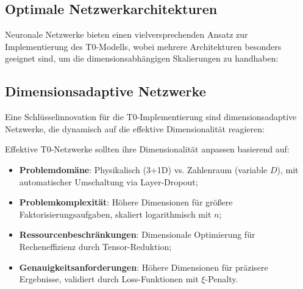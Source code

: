 \subsection{Optimale Netzwerkarchitekturen}
\label{subsec:optimal_architectures}
Neuronale Netzwerke bieten einen vielversprechenden Ansatz zur Implementierung des T0-Modells, wobei mehrere Architekturen besonders geeignet sind, um die dimensionsabhängigen Skalierungen zu handhaben:
\begin{table}[htbp]
	\centering
	\caption{Neuronale Netzwerkarchitekturen für T0-Implementierung, erweitert um spezifische T0-Vorteile}
	\label{tab:network_architectures}
\end{table}
\subsection{Dimensionsadaptive Netzwerke}
\label{subsec:dimension_adaptive}
Eine Schlüsselinnovation für die T0-Implementierung sind dimensionsadaptive Netzwerke, die dynamisch auf die effektive Dimensionalität reagieren:
\begin{formula}
	Effektive T0-Netzwerke sollten ihre Dimensionalität anpassen basierend auf:
	\begin{itemize}
		\item \textbf{Problemdomäne}: Physikalisch (3+1D) vs. Zahlenraum (variable $D$), mit automatischer Umschaltung via Layer-Dropout;
		\item \textbf{Problemkomplexität}: Höhere Dimensionen für größere Faktorisierungsaufgaben, skaliert logarithmisch mit $n$;
		\item \textbf{Ressourcenbeschränkungen}: Dimensionale Optimierung für Recheneffizienz durch Tensor-Reduktion;
		\item \textbf{Genauigkeitsanforderungen}: Höhere Dimensionen für präzisere Ergebnisse, validiert durch Loss-Funktionen mit $\xi$-Penalty.
	\end{itemize}
\end{formula}
